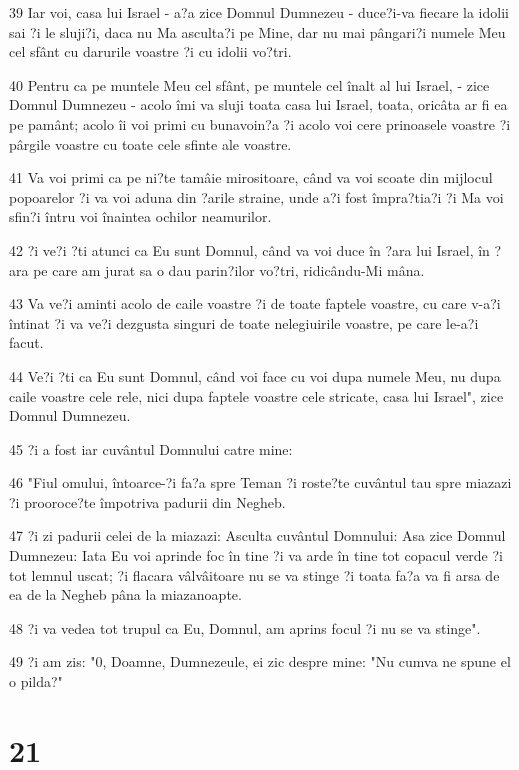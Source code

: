 \par 39 Iar voi, casa lui Israel - a?a zice Domnul Dumnezeu - duce?i-va fiecare la idolii sai ?i le sluji?i, daca nu Ma asculta?i pe Mine, dar nu mai pângari?i numele Meu cel sfânt cu darurile voastre ?i cu idolii vo?tri.
\par 40 Pentru ca pe muntele Meu cel sfânt, pe muntele cel înalt al lui Israel, - zice Domnul Dumnezeu - acolo îmi va sluji toata casa lui Israel, toata, oricâta ar fi ea pe pamânt; acolo îi voi primi cu bunavoin?a ?i acolo voi cere prinoasele voastre ?i pârgile voastre cu toate cele sfinte ale voastre.
\par 41 Va voi primi ca pe ni?te tamâie mirositoare, când va voi scoate din mijlocul popoarelor ?i va voi aduna din ?arile straine, unde a?i fost împra?tia?i ?i Ma voi sfin?i întru voi înaintea ochilor neamurilor.
\par 42 ?i ve?i ?ti atunci ca Eu sunt Domnul, când va voi duce în ?ara lui Israel, în ?ara pe care am jurat sa o dau parin?ilor vo?tri, ridicându-Mi mâna.
\par 43 Va ve?i aminti acolo de caile voastre ?i de toate faptele voastre, cu care v-a?i întinat ?i va ve?i dezgusta singuri de toate nelegiuirile voastre, pe care le-a?i facut.
\par 44 Ve?i ?ti ca Eu sunt Domnul, când voi face cu voi dupa numele Meu, nu dupa caile voastre cele rele, nici dupa faptele voastre cele stricate, casa lui Israel", zice Domnul Dumnezeu.
\par 45 ?i a fost iar cuvântul Domnului catre mine:
\par 46 "Fiul omului, întoarce-?i fa?a spre Teman ?i roste?te cuvântul tau spre miazazi ?i prooroce?te împotriva padurii din Negheb.
\par 47 ?i zi padurii celei de la miazazi: Asculta cuvântul Domnului: Asa zice Domnul Dumnezeu: Iata Eu voi aprinde foc în tine ?i va arde în tine tot copacul verde ?i tot lemnul uscat; ?i flacara vâlvâitoare nu se va stinge ?i toata fa?a va fi arsa de ea de la Negheb pâna la miazanoapte.
\par 48 ?i va vedea tot trupul ca Eu, Domnul, am aprins focul ?i nu se va stinge".
\par 49 ?i am zis: "0, Doamne, Dumnezeule, ei zic despre mine: "Nu cumva ne spune el o pilda?"

\chapter{21}

